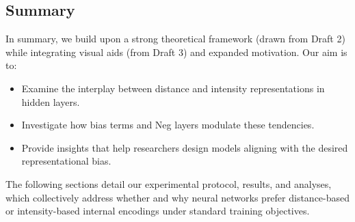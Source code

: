 \documentclass{article}
\begin{document}
\subsection{Summary}
In summary, we build upon a strong theoretical framework (drawn from Draft 2) while integrating visual aids (from Draft 3) and expanded motivation. Our aim is to:
\begin{itemize}
    \item Examine the interplay between distance and intensity representations in hidden layers.
    \item Investigate how bias terms and Neg layers modulate these tendencies.
    \item Provide insights that help researchers design models aligning with the desired representational bias.
\end{itemize}
The following sections detail our experimental protocol, results, and analyses, which collectively address whether and why neural networks prefer distance-based or intensity-based internal encodings under standard training objectives.


\end{document}
